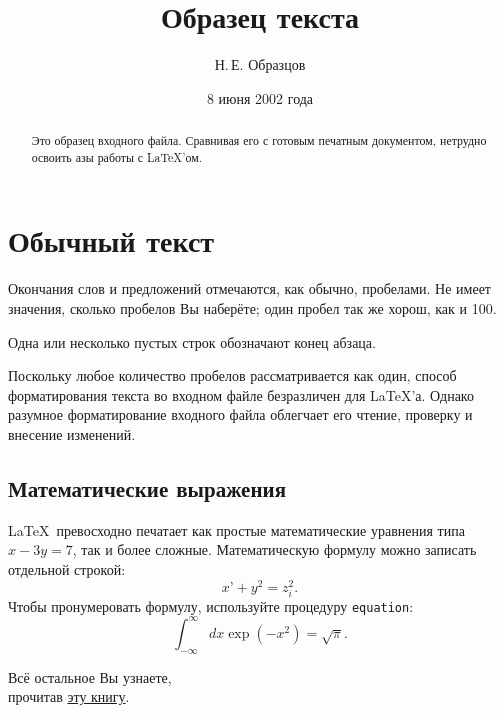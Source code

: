 \documentclass{article} %
\title{Образец текста} %
\author{Н.\,Е. Образцов} %
\date{8 июня 2002 года } %
\begin{document}

\maketitle %

\begin{abstract} %

Это образец входного файла.
Сравнивая его с готовым печатным документом, нетрудно освоить азы работы с \LaTeX’ом. %

\end{abstract}

\section{Обычный текст} %
Окончания слов и предложений отмечаются, как обычно,
пробелами. Не имеет значения, сколько пробелов Вы
наберёте; один пробел так же хорош, как и 100.


Одна или несколько пустых строк обозначают конец абзаца.

Поскольку любое количество пробелов рассматривается как один,
способ форматирования текста во входном файле безразличен для
\LaTeX’а.
Однако разумное форматирование входного файла облегчает его
чтение, проверку и внесение изменений.

\subsection{Математические выражения}
\LaTeX\ превосходно печатает как простые математические уравнения типа
\( x-3y = 7 \),
так и более сложные.
Математическую формулу можно записать отдельной строкой:
\[ x’ + y^{2} = z_{i}^{2}. \]
Чтобы пронумеровать формулу, используйте процедуру \texttt{equation}:
\begin{equation}
\int_{-\infty}^{\infty} dx \exp(-x^2) = \sqrt{\pi}.
\end{equation}
\begin{center} %
\Large %
Всё остальное Вы узнаете,\\ прочитав \href{https://elitagroup.ru/content/school/web/20170130/Latex_rus.pdf}{эту книгу}.
\end{center}
\end{document}
